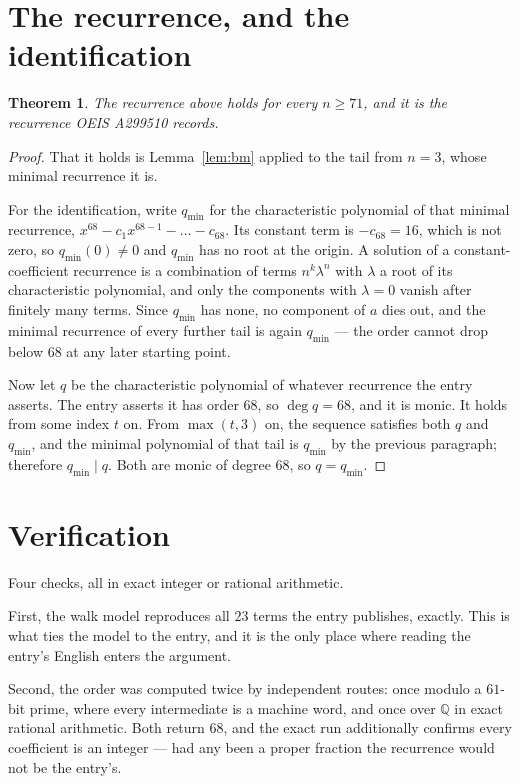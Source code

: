 \documentclass[11pt,a4paper]{article}
\theoremstyle{plain}
\newtheorem{theorem}{Theorem}
\theoremstyle{definition}
\begin{document}
\section{The recurrence, and the identification}

\begin{theorem}
The recurrence above holds for every $n\ge71$, and it is the recurrence OEIS A299510 records.
\end{theorem}

\begin{proof}
That it holds is Lemma~\ref{lem:bm} applied to the tail from $n=3$, whose minimal
recurrence it is.

For the identification, write $q_{\min}$ for the characteristic polynomial of that minimal
recurrence, $x^{68}-c_1x^{68-1}-\dots-c_{68}$. Its constant term is
$-c_{68}=16$, which is not zero, so $q_{\min}(0)\neq0$ and $q_{\min}$ has no
root at the origin. A solution of a constant-coefficient recurrence is a combination of terms
$n^{k}\lambda^{n}$ with $\lambda$ a root of its characteristic polynomial, and only the
components with $\lambda=0$ vanish after finitely many terms. Since $q_{\min}$ has none, no
component of $a$ dies out, and the minimal recurrence of every further tail is again
$q_{\min}$ --- the order cannot drop below $68$ at any later starting point.

Now let $q$ be the characteristic polynomial of whatever recurrence the entry asserts. The
entry asserts it has order $68$, so $\deg q=68$, and it is monic. It holds from some
index $t$ on. From $\max(t,3)$ on, the sequence satisfies both $q$ and $q_{\min}$, and
the minimal polynomial of that tail is $q_{\min}$ by the previous paragraph; therefore
$q_{\min}\mid q$. Both are monic of degree $68$, so $q=q_{\min}$.
\end{proof}

\section{Verification}

Four checks, all in exact integer or rational arithmetic.

First, the walk model reproduces all $23$ terms the entry publishes, exactly. This is
what ties the model to the entry, and it is the only place where reading the entry's English
enters the argument.

Second, the order was computed twice by independent routes: once modulo a $61$-bit prime, where
every intermediate is a machine word, and once over $\mathbb{Q}$ in exact rational arithmetic.
Both return $68$, and the exact run additionally confirms every coefficient is an integer
--- had any been a proper fraction the recurrence would not be the entry's.
\end{document}

